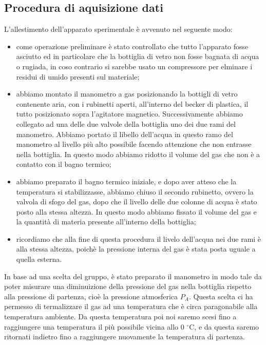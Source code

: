 \subsection{Procedura di aquisizione dati}
L'allestimento dell'apparato sperimentale è avvenuto nel seguente modo:

\begin{itemize}
	\item{come operazione preliminare è stato controllato che tutto l'apparato fosse asciutto ed in particolare che la bottiglia di vetro non fosse bagnata di acqua o rugiada, in coso contrario si sarebbe usato un compressore per elminare i residui di umido presenti sul materiale;}
	\item{abbiamo montato il manometro a gas posizionando la bottigli di vetro contenente aria, con i rubinetti aperti, all'interno del becker di plastica, il tutto posizionato sopra l'agitatore magnetico. Successivamente abbiamo collegato ad una delle due valvole della bottiglia uno dei due rami del manometro. Abbiamo portato il libello dell'acqua in questo ramo del manometro al livello più alto possibile facendo attenzione che non entrasse nella bottiglia. In questo modo abbiamo ridotto il volume del gas che non è a contatto con il bagno termico;}
	\item{abbiamo preparato il bagno termico iniziale, e dopo aver atteso che la temperatura si stabilizzasse, abbiamo chiuso il secondo rubinetto, ovvero la valvola di sfogo del gas, dopo che il livello delle due colonne di acqua è stato posto alla stessa altezza. In questo modo abbiamo fissato il volume del gas e la quantità di materia presente all'interno della bottiglia;}
	\item{ricordiamo che alla fine di questa procedura il livelo dell'acqua nei due rami è alla stessa altezza, poichè la pressione interna del gas è stata posta uguale a quella esterna.}
\end{itemize}
%

In base ad una scelta del gruppo, è stato preparato il manometro in modo tale da poter misurare una diminuizione della pressione del gas nella bottiglia rispetto alla pressione di partenza, cioè la pressione atmosferica $P_A$. Questa scelta ci ha permesso di termalizzare il gas ad una temperatura che è circa paragonabile alla temperatura ambiente. Da questa temperatura poi noi saremo scesi fino a raggiungere una temperatura il più possibile vicina allo 0 $^\circ$C, e da questa saremo ritornati indietro fino a raggiungere nuovamente la temperatura di partenza.

